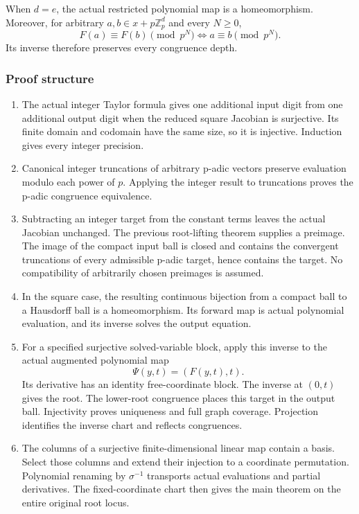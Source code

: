 When \(d=e\), the actual restricted polynomial map is a homeomorphism.
Moreover, for arbitrary \(a,b\in x+p\mathbb Z_p^d\) and every \(N\ge0\),
\[
F(a)\equiv F(b)\pmod{p^N}\iff a\equiv b\pmod{p^N}.
\] Its inverse therefore preserves every congruence depth.

\hypertarget{cont5:proof-structure}{%
\subsubsection{Proof structure}\label{cont5:proof-structure}}

\begin{enumerate}
\def\labelenumi{\arabic{enumi}.}
\tightlist
\item
  The actual integer Taylor formula gives one additional input digit
  from one additional output digit when the reduced square Jacobian is
  surjective. Its finite domain and codomain have the same size, so it
  is injective. Induction gives every integer precision.
\item
  Canonical integer truncations of arbitrary p-adic vectors preserve
  evaluation modulo each power of \(p\). Applying the integer result to
  truncations proves the p-adic congruence equivalence.
\item
  Subtracting an integer target from the constant terms leaves the
  actual Jacobian unchanged. The previous root-lifting theorem supplies
  a preimage. The image of the compact input ball is closed and contains
  the convergent truncations of every admissible p-adic target, hence
  contains the target. No compatibility of arbitrarily chosen preimages
  is assumed.
\item
  In the square case, the resulting continuous bijection from a compact
  ball to a Hausdorff ball is a homeomorphism. Its forward map is actual
  polynomial evaluation, and its inverse solves the output equation.
\item
  For a specified surjective solved-variable block, apply this inverse
  to the actual augmented polynomial map \[
  \Psi(y,t)=(F(y,t),t).
  \] Its derivative has an identity free-coordinate block. The inverse
  at \((0,t)\) gives the root. The lower-root congruence places this
  target in the output ball. Injectivity proves uniqueness and full
  graph coverage. Projection identifies the inverse chart and reflects
  congruences.
\item
  The columns of a surjective finite-dimensional linear map contain a
  basis. Select those columns and extend their injection to a coordinate
  permutation. Polynomial renaming by \(\sigma^{-1}\) transports actual
  evaluations and partial derivatives. The fixed-coordinate chart then
  gives the main theorem on the entire original root locus.
\end{enumerate}

